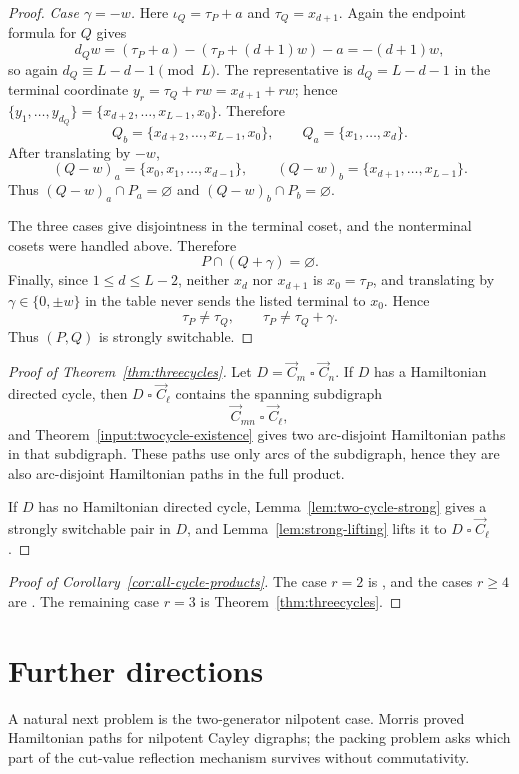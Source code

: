 \documentclass[11pt]{article}
\newcommand{\Boxprod}{\mathbin{\square}}
\begin{document}
\begin{proof}
\medskip
\noindent\emph{Case $\gamma=-w$.}
Here $\iota_Q=\tau_P+a$ and $\tau_Q=x_{d+1}$.  Again the endpoint formula for $Q$ gives
\[
        d_Qw=(\tau_P+a)-(\tau_P+(d+1)w)-a=-(d+1)w,
\]
so again $d_Q\equiv L-d-1\pmod L$.  The representative is $d_Q=L-d-1$ in the terminal coordinate $y_r=\tau_Q+rw=x_{d+1}+rw$; hence $\{y_1,\ldots,y_{d_Q}\}=\{x_{d+2},\ldots,x_{L-1},x_0\}$.  Therefore
\[
        Q_b=\{x_{d+2},\ldots,x_{L-1},x_0\},
        \qquad
        Q_a=\{x_1,\ldots,x_d\}.
\]
After translating by $-w$,
\[
        (Q-w)_a=\{x_0,x_1,\ldots,x_{d-1}\},
        \qquad
        (Q-w)_b=\{x_{d+1},\ldots,x_{L-1}\}.
\]
Thus $(Q-w)_a\cap P_a=\varnothing$ and $(Q-w)_b\cap P_b=\varnothing$.

The three cases give disjointness in the terminal coset, and the nonterminal cosets were handled above.  Therefore
\[
        P\cap(Q+\gamma)=\varnothing.
\]
Finally, since $1\le d\le L-2$, neither $x_d$ nor $x_{d+1}$ is $x_0=\tau_P$, and translating by $\gamma\in\{0,\pm w\}$ in the table never sends the listed terminal to $x_0$.  Hence
\[
        \tau_P\ne\tau_Q,
        \qquad
        \tau_P\ne\tau_Q+
        \gamma.
\]
Thus $(P,Q)$ is strongly switchable.
\end{proof}

\begin{proof}[Proof of Theorem~\ref{thm:threecycles}]
Let $D=\vec C_m\Boxprod\vec C_n$.  If $D$ has a Hamiltonian directed cycle, then $D\Boxprod\vec C_\ell$ contains the spanning subdigraph
\[
        \vec C_{mn}\Boxprod\vec C_\ell,
\]
and Theorem~\ref{input:twocycle-existence} gives two arc-disjoint Hamiltonian paths in that subdigraph.  These paths use only arcs of the subdigraph, hence they are also arc-disjoint Hamiltonian paths in the full product.

If $D$ has no Hamiltonian directed cycle, Lemma~\ref{lem:two-cycle-strong} gives a strongly switchable pair in $D$, and Lemma~\ref{lem:strong-lifting} lifts it to $D\Boxprod\vec C_\ell$.
\end{proof}

\begin{proof}[Proof of Corollary~\ref{cor:all-cycle-products}]
The case $r=2$ is \cite[Theorem~4.4]{DMM}, and the cases $r\ge4$ are \cite[Corollary~5.1]{DMM}.  The remaining case $r=3$ is Theorem~\ref{thm:threecycles}.
\end{proof}


\section*{Further directions}
A natural next problem is the two-generator nilpotent case.  Morris proved Hamiltonian paths for nilpotent Cayley digraphs; the packing problem asks which part of the cut-value reflection mechanism survives without commutativity.
\end{document}

